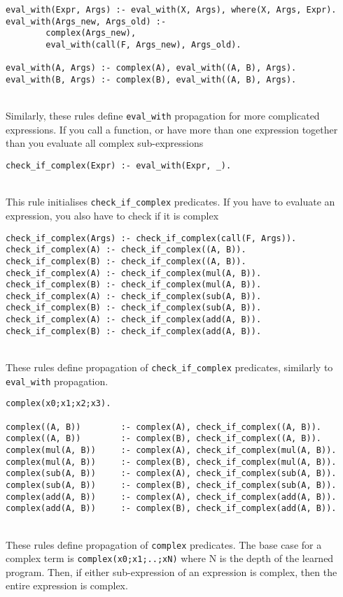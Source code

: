 \begin{lstlisting}
eval_with(Expr, Args) :- eval_with(X, Args), where(X, Args, Expr).
eval_with(Args_new, Args_old) :- 
		complex(Args_new), 
		eval_with(call(F, Args_new), Args_old).

eval_with(A, Args) :- complex(A), eval_with((A, B), Args).
eval_with(B, Args) :- complex(B), eval_with((A, B), Args).
\end{lstlisting}
\mbox{} \\
Similarly, these rules define \lstinline{eval_with} propagation for more complicated expressions. If you call a function, or have more than one expression together than you evaluate all complex sub-expressions \\ %

\begin{lstlisting}
check_if_complex(Expr) :- eval_with(Expr, _).
\end{lstlisting}
\mbox{} \\
This rule initialises \lstinline{check_if_complex} predicates. If you have to evaluate an expression, you also have to check if it is complex \\%

\begin{lstlisting}
check_if_complex(Args) :- check_if_complex(call(F, Args)).
check_if_complex(A) :- check_if_complex((A, B)).
check_if_complex(B) :- check_if_complex((A, B)).
check_if_complex(A) :- check_if_complex(mul(A, B)).
check_if_complex(B) :- check_if_complex(mul(A, B)).
check_if_complex(A) :- check_if_complex(sub(A, B)).
check_if_complex(B) :- check_if_complex(sub(A, B)).
check_if_complex(A) :- check_if_complex(add(A, B)).
check_if_complex(B) :- check_if_complex(add(A, B)).
\end{lstlisting}
\mbox{} \\
These rules define propagation of \lstinline{check_if_complex} predicates, similarly to \lstinline{eval_with} propagation. \\

\begin{lstlisting}
complex(x0;x1;x2;x3).

complex((A, B))        :- complex(A), check_if_complex((A, B)).
complex((A, B))        :- complex(B), check_if_complex((A, B)).
complex(mul(A, B))     :- complex(A), check_if_complex(mul(A, B)).
complex(mul(A, B))     :- complex(B), check_if_complex(mul(A, B)).
complex(sub(A, B))     :- complex(A), check_if_complex(sub(A, B)).
complex(sub(A, B))     :- complex(B), check_if_complex(sub(A, B)).
complex(add(A, B))     :- complex(A), check_if_complex(add(A, B)).
complex(add(A, B))     :- complex(B), check_if_complex(add(A, B)).
\end{lstlisting}
\mbox{} \\
These rules define propagation of \lstinline{complex} predicates. The base case for a complex term is \lstinline{complex(x0;x1;..;xN)} where N is the depth of the learned program. Then, if either sub-expression of an expression is complex, then the entire expression is complex. \\


